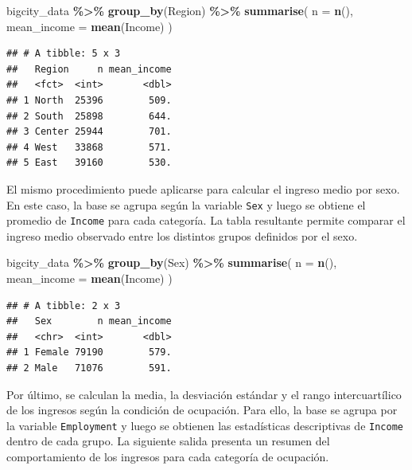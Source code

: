 \documentclass[
  spanish,
  12pt,
]{book}
\newenvironment{Shaded}{\begin{snugshade}}{\end{snugshade}}
\newcommand{\AttributeTok}[1]{\textcolor[rgb]{0.13,0.29,0.53}{#1}}
\newcommand{\FunctionTok}[1]{\textcolor[rgb]{0.13,0.29,0.53}{\textbf{#1}}}
\newcommand{\NormalTok}[1]{#1}
\newcommand{\SpecialCharTok}[1]{\textcolor[rgb]{0.81,0.36,0.00}{\textbf{#1}}}
\begin{document}
\begin{Shaded}
\begin{Highlighting}[]
\NormalTok{bigcity\_data }\SpecialCharTok{\%\textgreater{}\%}
  \FunctionTok{group\_by}\NormalTok{(Region) }\SpecialCharTok{\%\textgreater{}\%}
  \FunctionTok{summarise}\NormalTok{(}
    \AttributeTok{n =} \FunctionTok{n}\NormalTok{(),}
    \AttributeTok{mean\_income =} \FunctionTok{mean}\NormalTok{(Income)}
\NormalTok{  )}
\end{Highlighting}
\end{Shaded}

\begin{verbatim}
## # A tibble: 5 x 3
##   Region     n mean_income
##   <fct>  <int>       <dbl>
## 1 North  25396        509.
## 2 South  25898        644.
## 3 Center 25944        701.
## 4 West   33868        571.
## 5 East   39160        530.
\end{verbatim}

El mismo procedimiento puede aplicarse para calcular el ingreso medio por sexo. En este caso, la base se agrupa según la variable \texttt{Sex} y luego se obtiene el promedio de \texttt{Income} para cada categoría. La tabla resultante permite comparar el ingreso medio observado entre los distintos grupos definidos por el sexo.

\begin{Shaded}
\begin{Highlighting}[]
\NormalTok{bigcity\_data }\SpecialCharTok{\%\textgreater{}\%}
  \FunctionTok{group\_by}\NormalTok{(Sex) }\SpecialCharTok{\%\textgreater{}\%}
  \FunctionTok{summarise}\NormalTok{(}
    \AttributeTok{n =} \FunctionTok{n}\NormalTok{(),}
    \AttributeTok{mean\_income =} \FunctionTok{mean}\NormalTok{(Income)}
\NormalTok{  )}
\end{Highlighting}
\end{Shaded}

\begin{verbatim}
## # A tibble: 2 x 3
##   Sex        n mean_income
##   <chr>  <int>       <dbl>
## 1 Female 79190        579.
## 2 Male   71076        591.
\end{verbatim}

Por último, se calculan la media, la desviación estándar y el rango intercuartílico de los ingresos según la condición de ocupación. Para ello, la base se agrupa por la variable \texttt{Employment} y luego se obtienen las estadísticas descriptivas de \texttt{Income} dentro de cada grupo. La siguiente salida presenta un resumen del comportamiento de los ingresos para cada categoría de ocupación.
\end{document}
